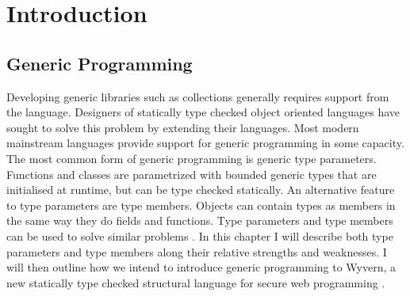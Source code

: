 \documentclass[11pt
              , a4paper
              , twoside
              , openright
              ]{report}
\numberwithin{case}{theorem}
\numberwithin{subcase}{case}
\begin{document}
\mainmatter



\chapter{Introduction}\label{ch:intro}
\section{Generic Programming}
Developing generic libraries such as collections generally requires support from the language. Designers of statically type checked object oriented languages have sought to solve this problem by extending their languages. Most modern mainstream languages provide support for generic programming in some capacity. The most common form of generic programming is generic type parameters. Functions and classes are parametrized with bounded generic types that are initialised at runtime, but can be type checked statically. An alternative feature to type parameters are type members. Objects can contain types as members in the same way they do fields and functions. Type parameters and type members can be used to solve similar problems \cite{Igarashi1999}. In this chapter I will describe both type parameters and type members along their relative strengths and weaknesses. I will then outline how we intend to introduce generic programming to Wyvern, a new statically type checked structural language for secure web programming \cite{Nistor:2013:WST:2489828.2489830}.
\end{document}
